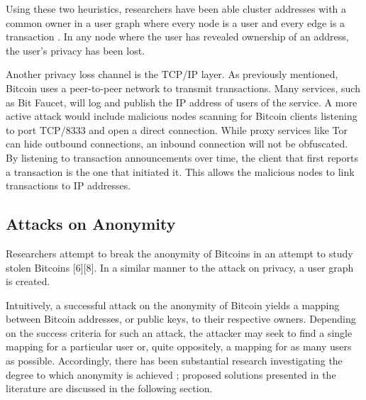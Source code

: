 Using these two heuristics, researchers have been able cluster addresses with a common owner in a user graph where every node is a user and every edge is a transaction \cite{Shamir13-bitcoingraph,ReidHarrigan13,Fistful12}. In any node where the user has revealed ownership of an address, the user's privacy has been lost.

Another privacy loss channel is the TCP/IP layer. As previously mentioned, Bitcoin uses a peer-to-peer network to transmit transactions. Many services, such as Bit Faucet, will log and publish the IP address of users of the service. A more active attack would include malicious nodes scanning for Bitcoin clients listening to port TCP/8333 \cite{ReidHarrigan13} and open a direct connection. While proxy services like Tor can hide outbound connections, an inbound connection will not be obfuscated. By listening to transaction announcements over time, the client that first reports a transaction is the one that initiated it. This allows the malicious nodes to link transactions to IP addresses.

\subsection{Attacks on Anonymity}
Researchers attempt to break the anonymity of Bitcoins in an attempt to study stolen Bitcoins [6][8]. In a similar manner to the attack on privacy, a user graph is created. 

Intuitively, a successful attack on the anonymity of Bitcoin yields a mapping between Bitcoin addresses, or public keys, to their respective owners. Depending on the success criteria for such an attack, the attacker may seek to find a single mapping for a particular user or, quite oppositely, a mapping for as many users as possible. Accordingly, there has been substantial research investigating the degree to which anonymity is achieved \cite{ReidHarrigan13,BetterToBitter,Fistful12,Shamir13-bitcoingraph,Androulaki12-privacy}; proposed solutions presented in the literature are discussed in the following section.

